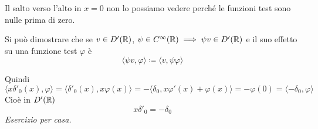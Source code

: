 Il salto verso l'alto in $x = 0$ non lo possiamo vedere perché le funzioni test sono nulle prima di zero.
\Soluzione
\begin{rem}
Si può dimostrare che se $v\in D'(\mathbb{R})$, $\psi \in C^{\infty }(\mathbb{R}) \implies \psi v\in D'(\mathbb{R})$ e il suo effetto su una funzione test $\varphi $ è
\begin{equation*}
\langle \psi v,\varphi \rangle \coloneqq \langle v,\psi \varphi \rangle 
\end{equation*}
\end{rem}
Quindi
\begin{equation*}
\langle x\delta '_{0} (x),\varphi \rangle = \langle \delta '_{0} (x),x\varphi (x) \rangle = - \langle \delta _{0} ,x\varphi '(x) + \varphi (x) \rangle = - \varphi (0) = \langle - \delta _{0} ,\varphi \rangle 
\end{equation*}
Cioè in $D'(\mathbb{R})$
\begin{equation*}
x\delta '_{0} = - \delta _{0}
\end{equation*}
\textit{Esercizio per casa.}

